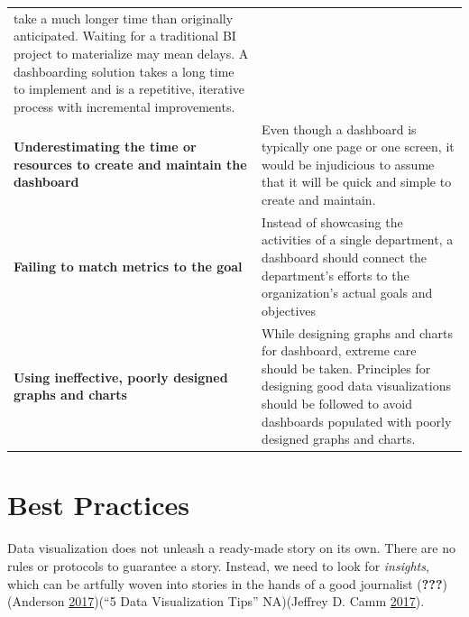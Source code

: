 \documentclass[]{book}
\theoremstyle{definition}
\theoremstyle{definition}
\theoremstyle{definition}
\theoremstyle{remark}
\begin{document}
\begin{longtable}[]{@{}ll@{}}
\begin{minipage}[t]{0.66\columnwidth}
take a much longer time than originally anticipated. Waiting for a
traditional BI project to materialize may mean delays. A dashboarding
solution takes a long time to implement and is a repetitive, iterative
process with incremental improvements.\strut
\end{minipage}\tabularnewline
\begin{minipage}[t]{0.29\columnwidth}\raggedright\strut
\textbf{Underestimating the time or resources to create and maintain the
dashboard}\strut
\end{minipage} & \begin{minipage}[t]{0.66\columnwidth}\raggedright\strut
Even though a dashboard is typically one page or one screen, it would be
injudicious to assume that it will be quick and simple to create and
maintain.\strut
\end{minipage}\tabularnewline
\begin{minipage}[t]{0.29\columnwidth}\raggedright\strut
\textbf{Failing to match metrics to the goal}\strut
\end{minipage} & \begin{minipage}[t]{0.66\columnwidth}\raggedright\strut
Instead of showcasing the activities of a single department, a dashboard
should connect the department's efforts to the organization's actual
goals and objectives\strut
\end{minipage}\tabularnewline
\begin{minipage}[t]{0.29\columnwidth}\raggedright\strut
\textbf{Using ineffective, poorly designed graphs and charts}\strut
\end{minipage} & \begin{minipage}[t]{0.66\columnwidth}\raggedright\strut
While designing graphs and charts for dashboard, extreme care should be
taken. Principles for designing good data visualizations should be
followed to avoid dashboards populated with poorly designed graphs and
charts.\strut
\end{minipage}\tabularnewline
\bottomrule
\end{longtable}

\section{Best Practices}\label{best-practices}

Data visualization does not unleash a ready-made story on its own. There
are no rules or protocols to guarantee a story. Instead, we need to look
for \emph{insights}, which can be artfully woven into stories in the
hands of a good journalist ({\textbf{???}})(Anderson
\protect\hyperlink{ref-design_principles}{2017})(``5 Data Visualization
Tips'' NA)(Jeffrey D. Camm
\protect\hyperlink{ref-practitioners_guide}{2017}).
\end{document}
